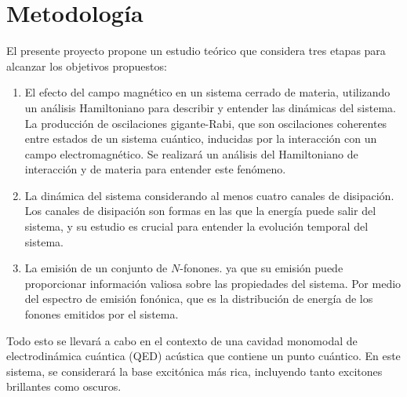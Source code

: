 \documentclass[../main.tex]{subfiles}
\begin{document}
\section{Metodología}
El presente proyecto propone un estudio te\'orico que considera tres etapas para alcanzar los
objetivos propuestos:
\begin{enumerate}
	\item El efecto del campo magnético en un sistema cerrado de materia, utilizando un análisis Hamiltoniano para describir y entender las dinámicas del sistema. La producción de oscilaciones gigante-Rabi, que son oscilaciones coherentes entre estados de un sistema cuántico, inducidas por la interacción con un campo electromagnético. Se realizará un análisis del Hamiltoniano de interacción y de materia para entender este fenómeno.
	\item La dinámica del sistema considerando al menos cuatro canales de disipación. Los canales de disipación son formas en las que la energía puede salir del sistema, y su estudio es crucial para entender la evolución temporal del sistema.
	\item La emisión de un conjunto de $N$-fonones. ya que su emisión puede proporcionar información valiosa sobre las propiedades del sistema. Por medio del espectro de emisión fonónica, que es la distribución de energía de los fonones emitidos por el sistema.
\end{enumerate}

Todo esto se llevará a cabo en el contexto de una cavidad monomodal de electrodinámica cuántica (QED) acústica que contiene un punto cuántico. En este sistema, se considerará la base excitónica más rica, incluyendo tanto excitones brillantes como oscuros.
%
\end{document}
